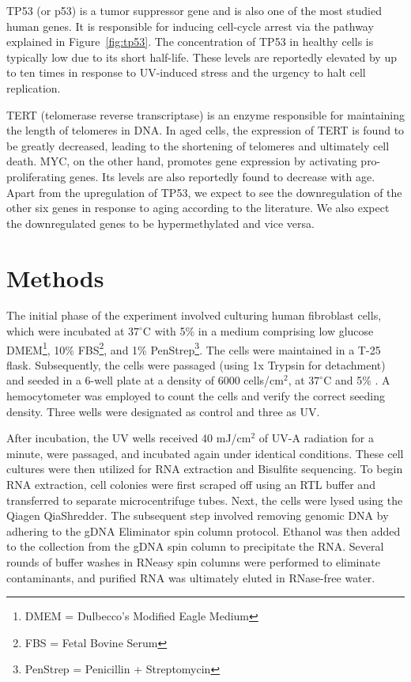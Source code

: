 \documentclass[letterpaper,11pt]{article}
\begin{document}
TP53 (or p53) is a tumor suppressor gene and is also one of the most studied human genes. It is responsible for inducing cell-cycle arrest via the pathway explained in Figure~\ref{fig:tp53}\cite{ref:tp53_new}. The concentration of TP53 in healthy cells is typically low due to its short half-life. These levels are reportedly elevated by up to ten times in response to UV-induced stress and the urgency to halt cell replication.

TERT (telomerase reverse transcriptase) is an enzyme responsible for maintaining the length of telomeres in DNA. In aged cells, the expression of TERT is found to be greatly decreased, leading to the shortening of telomeres and ultimately cell death\cite{ref:tert}. MYC, on the other hand, promotes gene expression by activating pro-proliferating genes. Its levels are also reportedly found to decrease with age\cite{ref:myc}. Apart from the upregulation of TP53, we expect to see the downregulation of the other six genes in response to aging according to the literature. We also expect the downregulated genes to be hypermethylated and vice versa.

\newpage
\section{Methods}
The initial phase of the experiment involved culturing human fibroblast cells, which were incubated at $37^{\circ}$C with 5\%  in a medium comprising low glucose DMEM\footnote{DMEM = Dulbecco's Modified Eagle Medium}, 10\% FBS\footnote{FBS = Fetal Bovine Serum}, and 1\% PenStrep\footnote{PenStrep = Penicillin + Streptomycin}. The cells were maintained in a T-25 flask. Subsequently, the cells were passaged (using 1x Trypsin for detachment) and seeded in a 6-well plate at a density of 6000 cells/cm$^2$, at $37^{\circ}$C and 5\% . A hemocytometer was employed to count the cells and verify the correct seeding density. Three wells were designated as control and three as UV.

After incubation, the UV wells received 40 mJ/cm$^2$ of UV-A radiation for a minute, were passaged, and incubated again under identical conditions. These cell cultures were then utilized for RNA extraction and Bisulfite sequencing. To begin RNA extraction, cell colonies were first scraped off using an RTL buffer and transferred to separate microcentrifuge tubes. Next, the cells were lysed using the Qiagen QiaShredder. The subsequent step involved removing genomic DNA by adhering to the gDNA Eliminator spin column protocol. Ethanol was then added to the collection from the gDNA spin column to precipitate the RNA. Several rounds of buffer washes in RNeasy spin columns were performed to eliminate contaminants, and purified RNA was ultimately eluted in RNase-free water.
\end{document}

